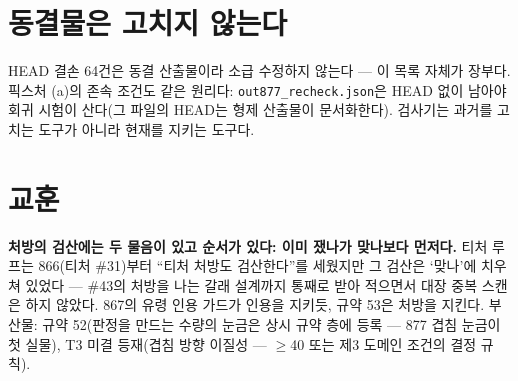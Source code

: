 \documentclass[10pt]{article}
\begin{document}
\section{동결물은 고치지 않는다}

HEAD 결손 64건은 동결 산출물이라 소급 수정하지 않는다 --- 이
목록 자체가 장부다. 픽스처 (a)의 존속 조건도 같은 원리다:
\texttt{out877\_recheck.json}은 HEAD 없이 남아야 회귀 시험이
산다(그 파일의 HEAD는 형제 산출물이 문서화한다). 검사기는
과거를 고치는 도구가 아니라 현재를 지키는 도구다.

\section{교훈}

\textbf{처방의 검산에는 두 물음이 있고 순서가 있다: 이미
쟀나가 맞나보다 먼저다.} 티처 루프는 866(티처 \#31)부터
``티처 처방도 검산한다''를 세웠지만 그 검산은 `맞나'에 치우쳐
있었다 --- \#43의 처방을 나는 갈래 설계까지 통째로 받아
적으면서 대장 중복 스캔은 하지 않았다. 867의 유령 인용 가드가
인용을 지키듯, 규약 53은 처방을 지킨다. 부산물: 규약 52(판정을 만드는 수량의
눈금은 상시 규약 층에 등록 --- 877 겹침 눈금이 첫 실물),
T3 미결 등재(겹침 방향 이질성 --- $\geq$40 또는 제3 도메인
조건의 결정 규칙).
\end{document}
